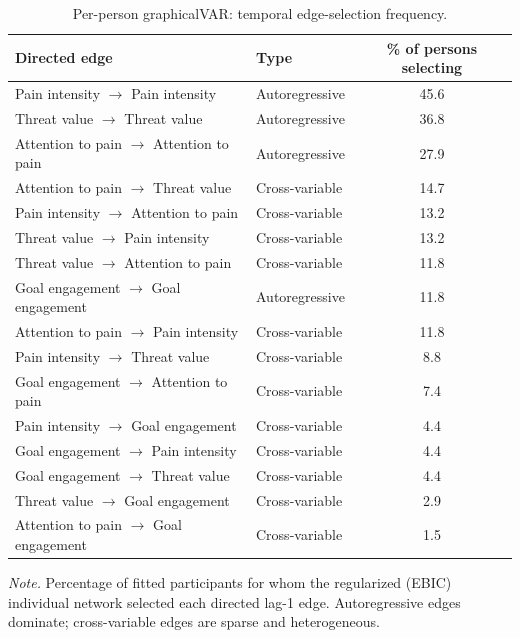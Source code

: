 \begin{table}[!htbp]
\raggedright
\caption{Per-person graphicalVAR: temporal edge-selection frequency.}
\label{tab:sup-graphicalvar}
\scriptsize
\begingroup
\setlength{\tabcolsep}{4pt}
\renewcommand{\arraystretch}{1.08}
\noindent
\begin{tabular*}{\textwidth}{@{\extracolsep{\fill}}llc@{}}
\toprule
Directed edge & Type & \% of persons selecting \\
\midrule
Pain intensity $\rightarrow$ Pain intensity & Autoregressive & 45.6 \\
Threat value $\rightarrow$ Threat value & Autoregressive & 36.8 \\
Attention to pain $\rightarrow$ Attention to pain & Autoregressive & 27.9 \\
Attention to pain $\rightarrow$ Threat value & Cross-variable & 14.7 \\
Pain intensity $\rightarrow$ Attention to pain & Cross-variable & 13.2 \\
Threat value $\rightarrow$ Pain intensity & Cross-variable & 13.2 \\
Threat value $\rightarrow$ Attention to pain & Cross-variable & 11.8 \\
Goal engagement $\rightarrow$ Goal engagement & Autoregressive & 11.8 \\
Attention to pain $\rightarrow$ Pain intensity & Cross-variable & 11.8 \\
Pain intensity $\rightarrow$ Threat value & Cross-variable & 8.8 \\
Goal engagement $\rightarrow$ Attention to pain & Cross-variable & 7.4 \\
Pain intensity $\rightarrow$ Goal engagement & Cross-variable & 4.4 \\
Goal engagement $\rightarrow$ Pain intensity & Cross-variable & 4.4 \\
Goal engagement $\rightarrow$ Threat value & Cross-variable & 4.4 \\
Threat value $\rightarrow$ Goal engagement & Cross-variable & 2.9 \\
Attention to pain $\rightarrow$ Goal engagement & Cross-variable & 1.5 \\
\bottomrule
\end{tabular*}
\par\vspace{3pt}\noindent\parbox{\textwidth}{\scriptsize\textit{Note.} Percentage of fitted participants for whom the regularized (EBIC) individual network selected each directed lag-1 edge. Autoregressive edges dominate; cross-variable edges are sparse and heterogeneous.}
\endgroup
\end{table}
